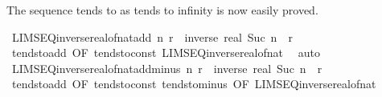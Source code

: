 \begin{isabellebody}
\endisatagproof
{\isafoldproof}%
%
\isadelimproof
%
\endisadelimproof
%
\begin{isamarkuptext}%
The sequence  tends to  as  tends to
  infinity is now easily proved.%
\end{isamarkuptext}\isamarkuptrue%
\isamarkupfalse%
\ LIMSEQ{\isacharunderscore}{\kern0pt}inverse{\isacharunderscore}{\kern0pt}real{\isacharunderscore}{\kern0pt}of{\isacharunderscore}{\kern0pt}nat{\isacharunderscore}{\kern0pt}add{\isacharcolon}{\kern0pt}\ {\isachardoublequoteopen}{\isacharparenleft}{\kern0pt}{\isasymlambda}n{\isachardot}{\kern0pt}\ r\ {\isacharplus}{\kern0pt}\ inverse\ {\isacharparenleft}{\kern0pt}real\ {\isacharparenleft}{\kern0pt}Suc\ n{\isacharparenright}{\kern0pt}{\isacharparenright}{\kern0pt}{\isacharparenright}{\kern0pt}\ {\isasymlonglonglongrightarrow}\ r{\isachardoublequoteclose}\isanewline
%
\isadelimproof
\ \ %
\endisadelimproof
%
\isatagproof
{}\isamarkupfalse%
\ tendsto{\isacharunderscore}{\kern0pt}add\ {\isacharbrackleft}{\kern0pt}OF\ tendsto{\isacharunderscore}{\kern0pt}const\ LIMSEQ{\isacharunderscore}{\kern0pt}inverse{\isacharunderscore}{\kern0pt}real{\isacharunderscore}{\kern0pt}of{\isacharunderscore}{\kern0pt}nat{\isacharbrackright}{\kern0pt}\ \isamarkupfalse%
\ auto%
\endisatagproof
{\isafoldproof}%
%
\isadelimproof
\isanewline
%
\endisadelimproof
\isanewline
{}\isamarkupfalse%
\ LIMSEQ{\isacharunderscore}{\kern0pt}inverse{\isacharunderscore}{\kern0pt}real{\isacharunderscore}{\kern0pt}of{\isacharunderscore}{\kern0pt}nat{\isacharunderscore}{\kern0pt}add{\isacharunderscore}{\kern0pt}minus{\isacharcolon}{\kern0pt}\ {\isachardoublequoteopen}{\isacharparenleft}{\kern0pt}{\isasymlambda}n{\isachardot}{\kern0pt}\ r\ {\isacharplus}{\kern0pt}\ {\isacharminus}{\kern0pt}inverse\ {\isacharparenleft}{\kern0pt}real\ {\isacharparenleft}{\kern0pt}Suc\ n{\isacharparenright}{\kern0pt}{\isacharparenright}{\kern0pt}{\isacharparenright}{\kern0pt}\ {\isasymlonglonglongrightarrow}\ r{\isachardoublequoteclose}\isanewline
%
\isadelimproof
\ \ %
\endisadelimproof
%
\isatagproof
{}\isamarkupfalse%
\ tendsto{\isacharunderscore}{\kern0pt}add\ {\isacharbrackleft}{\kern0pt}OF\ tendsto{\isacharunderscore}{\kern0pt}const\ tendsto{\isacharunderscore}{\kern0pt}minus\ {\isacharbrackleft}{\kern0pt}OF\ LIMSEQ{\isacharunderscore}{\kern0pt}inverse{\isacharunderscore}{\kern0pt}real{\isacharunderscore}{\kern0pt}of{\isacharunderscore}{\kern0pt}nat{\isacharbrackright}{\kern0pt}{\isacharbrackright}{\kern0pt}\isanewline

\end{isabellebody}
